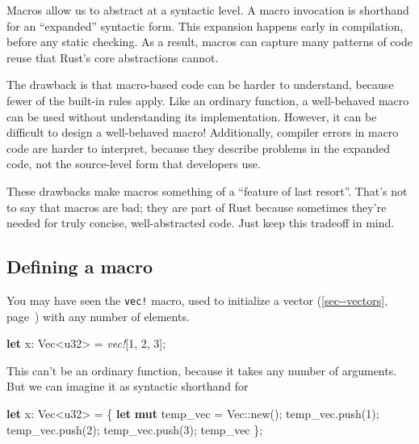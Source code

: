 \documentclass[a4paper,]{book}
\renewcommand*{\hyperref}[2][\ar]{%
  \def\ar{#2}%
  #2 (\autoref{#1}, page~\pageref{#1})}
\newenvironment{Shaded}{\begin{snugshade}}{\end{snugshade}}
\newcommand{\KeywordTok}[1]{\textcolor[rgb]{0.13,0.29,0.53}{\textbf{{#1}}}}
\newcommand{\DataTypeTok}[1]{\textcolor[rgb]{0.13,0.29,0.53}{{#1}}}
\newcommand{\DecValTok}[1]{\textcolor[rgb]{0.00,0.00,0.81}{{#1}}}
\newcommand{\PreprocessorTok}[1]{\textcolor[rgb]{0.56,0.35,0.01}{\textit{{#1}}}}
\newcommand{\NormalTok}[1]{{#1}}
\begin{document}
Macros allow us to abstract at a syntactic level. A macro invocation is
shorthand for an ``expanded'' syntactic form. This expansion happens
early in compilation, before any static checking. As a result, macros
can capture many patterns of code reuse that Rust's core abstractions
cannot.

The drawback is that macro-based code can be harder to understand,
because fewer of the built-in rules apply. Like an ordinary function, a
well-behaved macro can be used without understanding its implementation.
However, it can be difficult to design a well-behaved macro!
Additionally, compiler errors in macro code are harder to interpret,
because they describe problems in the expanded code, not the
source-level form that developers use.

These drawbacks make macros something of a ``feature of last resort''.
That's not to say that macros are bad; they are part of Rust because
sometimes they're needed for truly concise, well-abstracted code. Just
keep this tradeoff in mind.

\subsection{Defining a macro}\label{defining-a-macro}

You may have seen the \texttt{vec!} macro, used to initialize a
\hyperref[sec--vectors]{vector} with any number of elements.

\begin{Shaded}
\begin{Highlighting}[]
\KeywordTok{let} \NormalTok{x: }\DataTypeTok{Vec}\NormalTok{<}\DataTypeTok{u32}\NormalTok{> = }\PreprocessorTok{vec!}\NormalTok{[}\DecValTok{1}\NormalTok{, }\DecValTok{2}\NormalTok{, }\DecValTok{3}\NormalTok{];}
\end{Highlighting}
\end{Shaded}

This can't be an ordinary function, because it takes any number of
arguments. But we can imagine it as syntactic shorthand for

\begin{Shaded}
\begin{Highlighting}[]
\KeywordTok{let} \NormalTok{x: }\DataTypeTok{Vec}\NormalTok{<}\DataTypeTok{u32}\NormalTok{> = \{}
    \KeywordTok{let} \KeywordTok{mut} \NormalTok{temp_vec = }\DataTypeTok{Vec}\NormalTok{::new();}
    \NormalTok{temp_vec.push(}\DecValTok{1}\NormalTok{);}
    \NormalTok{temp_vec.push(}\DecValTok{2}\NormalTok{);}
    \NormalTok{temp_vec.push(}\DecValTok{3}\NormalTok{);}
    \NormalTok{temp_vec}
\NormalTok{\};}
\end{Highlighting}
\end{Shaded}
\end{document}
